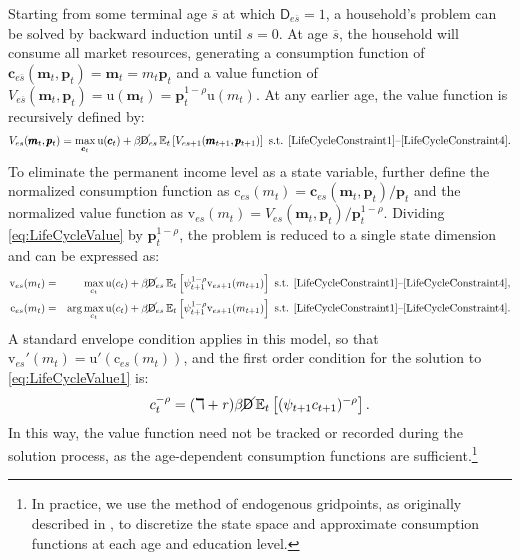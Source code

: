 \documentclass{econtex}\usepackage{graphicx} \usepackage{hyperref} \usepackage{ushort}
\newcommand{\cFunc}{\ensuremath{\mathrm{c}}}
\newcommand{\cLev}{\ensuremath{\pmb{c}}}
\newcommand{\cRat}{\ensuremath{c}}
\newcommand{\CRRA}{\ensuremath{\rho}}
\newcommand{\Discount}{\ensuremath{\beta}}
\newcommand{\mLev}{\ensuremath{\pmb{m}}}
\newcommand{\mRat}{\ensuremath{m}}
\newcommand{\PDies}{\ensuremath{\mathsf{D}}}
\newcommand{\pLev}{\ensuremath{\pmb{p}}}
\newcommand{\PLives}{\ensuremath{\cancel{\PDies}}}
\newcommand{\pshk}{\psi} %
\newcommand{\rProd}{\ensuremath{\mathit{r}}}
\newcommand{\util}{{\ensuremath{\mathrm{u}}}}
\newcommand{\vFunc}{\ensuremath{\mathrm{v}}}
\begin{document}
Starting from some terminal age $\overline{s}$ at which $\PDies_{e\overline{s}} = 1$, a household's problem can be solved by backward induction until $s = 0$.  At age $\overline{s}$, the household will consume all market resources, generating a consumption function of $\cLev_{e\overline{s}}(\mLev_t,\pLev_t) = \mLev_t = \mRat_t \pLev_t$ and a value function of $V_{e\overline{s}}(\mLev_t,\pLev_t) = \util(\mLev_t) = \pLev_t^{1-\CRRA} \util(\mRat_t)$.  At any earlier age, the value function is recursively defined by:
\begin{equation}
\label{eq:LifeCycleValue}
V_{es}(\mLev_t,\pLev_t) = \max_{\cLev_t} \util(\cLev_t) + \Discount \PLives_{es} \Ex_t \left[ V_{es+1}(\mLev_{t+1},\pLev_{t+1})\right] \text{ s.t. \eqref{LifeCycleConstraint1}--\eqref{LifeCycleConstraint4}}.
\end{equation}
To eliminate the permanent income level as a state variable, further define the normalized consumption function as $\cFunc_{es}(\mRat_t) = \cLev_{es}(\mLev_t,\pLev_t)/\pLev_t$ and the normalized value function as $\vFunc_{es}(\mRat_t) = V_{es}(\mLev_t,\pLev_t)/\pLev_t^{1-\CRRA}$.  Dividing \eqref{eq:LifeCycleValue} by $\pLev_t^{1-\CRRA}$, the problem is reduced to a single state dimension and can be expressed as:
\begin{eqnarray}\label{eq:LifeCycleValue1}
\vFunc_{es}(\mRat_t) &=& \max_{\cRat_t} \util(\cRat_t) + \Discount \PLives_{es} \Ex_t \left[\pshk_{t+1}^{1-\CRRA} \vFunc_{es+1}(\mRat_{t+1})\right] \text{ s.t. \eqref{LifeCycleConstraint1}--\eqref{LifeCycleConstraint4}},\\
\cFunc_{es}(\mRat_t) &=& \arg\max_{\cRat_t} \util(\cRat_t) + \Discount \PLives_{es} \Ex_t \left[\pshk_{t+1}^{1-\CRRA} \vFunc_{es+1}(\mRat_{t+1})\right] \text{ s.t. \eqref{LifeCycleConstraint1}--\eqref{LifeCycleConstraint4}}. \nonumber
\end{eqnarray}
A standard envelope condition applies in this model, so that $\vFunc_{es}'(\mRat_t) = \util'(\cFunc_{es}(\mRat_t))$, and the first order condition for the solution to \eqref{eq:LifeCycleValue1} is:
\begin{equation}
\cRat_t^{-\CRRA} = (\daleth +\rProd) \Discount \PLives \Ex_t \left[ (\pshk_{t+1} \cRat_{t+1})^{-\CRRA} \right].
\end{equation}
In this way, the value function need not be tracked or recorded during the solution process, as the age-dependent consumption functions are sufficient.\footnote{In practice, we use the method of endogenous gridpoints, as originally described in \cite{EndogenousGridpoints}, to discretize the state space and approximate consumption functions at each age and education level.}
\end{document}
